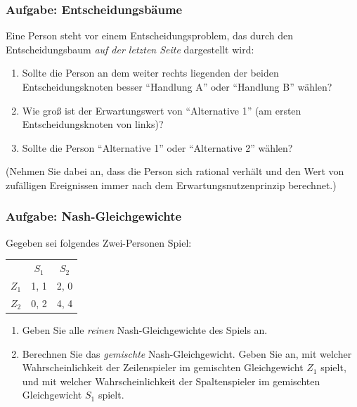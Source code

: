 \subsubsection*{Aufgabe: Entscheidungsbäume}
\label{BaumAufgabe}
Eine Person steht vor einem Entscheidungsproblem, das durch den Entscheidungsbaum {\em auf der letzten Seite} dargestellt wird:
\begin{enumerate}
  \item Sollte die Person an dem weiter rechts liegenden der beiden
  Entscheidungsknoten besser "`Handlung A"' oder "`Handlung B"' wählen?
  \item Wie groß ist der Erwartungswert von "`Alternative 1"' (am ersten
  Entscheidungsknoten von links)?
  \item Sollte die Person "`Alternative 1"' oder "`Alternative 2"' wählen?
\end{enumerate}
(Nehmen Sie dabei an, dass die Person sich rational verhält und den Wert von
zufälligen Ereignissen immer nach dem Erwartungsnutzenprinzip berechnet.)

\subsubsection*{Aufgabe: Nash-Gleichgewichte}

Gegeben sei folgendes Zwei-Personen Spiel:

\begin{center}
\begin{tabular}{c|c|c|}
\multicolumn{1}{c}{} & \multicolumn{1}{c}{$S_1$} &
                               \multicolumn{1}{c}{$S_2$} \\ \cline{2-3} 
$Z_1$                & 1, 1           & 2, 0  \\ \cline{2-3} 
$Z_2$                & 0, 2           & 4, 4  \\ \cline{2-3}
\end{tabular}
\end{center}

\begin{enumerate}
  \item Geben Sie alle {\em reinen} Nash-Gleichgewichte des Spiels an.
  \item Berechnen Sie das {\em gemischte} Nash-Gleichgewicht. Geben Sie an, mit
  welcher Wahrscheinlichkeit der Zeilenspieler im gemischten Gleichgewicht $Z_1$ spielt, und mit welcher 
  Wahrscheinlichkeit der Spaltenspieler im gemischten Gleichgewicht $S_1$ spielt.
\end{enumerate}


